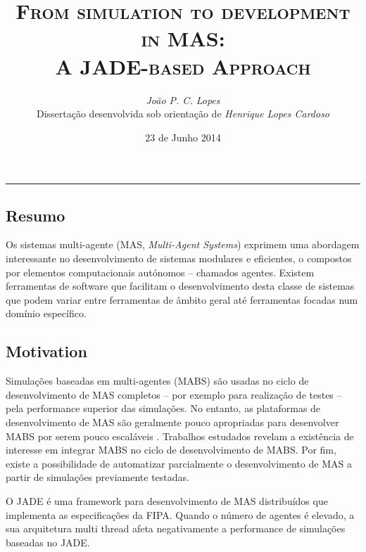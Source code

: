 \documentclass[9pt,a4paper]{extarticle}
\begin{document}
\title{\vspace*{-8mm}\textbf{\textsc{
  From simulation to development in MAS:\\
  A JADE-based Approach
}}}
\author{
  \emph{João P. C. Lopes}\\[2mm]
  \small{Dissertação desenvolvida sob orientação de \emph{Henrique Lopes Cardoso}}
}
\date{23 de Junho 2014}
\maketitle
\thispagestyle{empty}

\vspace*{-4mm}\noindent\rule{\textwidth}{0.4pt}\vspace*{4mm}

\begin{multicols}{2}

\section{Resumo}

Os sistemas multi-agente (MAS, \emph{Multi-Agent Systems}) exprimem uma abordagem interessante no desenvolvimento de sistemas modulares e eficientes, o compostos por elementos computacionais autónomos -- chamados agentes. Existem ferramentas de software que facilitam o desenvolvimento desta classe de sistemas que podem variar entre ferramentas de âmbito geral até ferramentas focadas num domínio específico.

\subsection{Motivation}
Simulações baseadas em multi-agentes (MABS) são usadas no ciclo de desenvolvimento de MAS completos -- por exemplo para realização de testes -- pela performance superior das simulações. No entanto, as plataformas de desenvolvimento de MAS são geralmente pouco apropriadas para desenvolver MABS por serem pouco escaláveis \cite{mengistu2008scalability}. Trabalhos estudados revelam a existência de interesse em integrar MABS no ciclo de desenvolvimento de MABS. Por fim, existe a possibilidade de automatizar parcialmente o desenvolvimento de MAS a partir de simulações previamente testadas.

O JADE \cite{bellifemine2007developing} é uma framework para desenvolvimento de MAS distribuídos que implementa as especificações da FIPA. Quando o número de agentes é elevado, a sua arquitetura multi thread afeta negativamente a performance de simulações baseadas no JADE.


\end{multicols}
\end{document}
